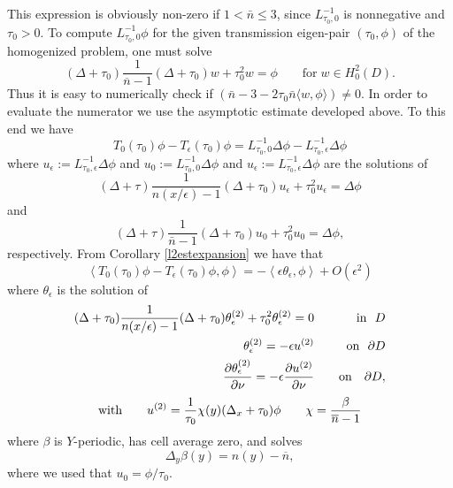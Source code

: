 \documentclass[12pt]{article}
\begin{document}
This expression is obviously non-zero if $1<\bar n\leq 3$, since $L^{-1}_{\tau_0,0}$ is nonnegative and $\tau_0>0$.  To compute  $L^{-1}_{\tau_0,0}\phi$ for the given transmission eigen-pair $(\tau_0,\phi)$ of the homogenized problem, one must solve 
$$(\Delta +\tau_0 ) \frac{1}{\overline{n}-1} (\Delta +\tau_0 )w +\tau_0^2w=\phi \qquad \mbox{for}\; w\in H^2_0(D).$$
Thus it is easy to numerically check if $\left(\bar n-3  -2\tau_0\bar n \langle w,\phi\rangle\right)\neq 0$. In order to  evaluate the numerator we use the asymptotic estimate developed above.  To this end we have 
$$T_0(\tau_0)\phi-T_\epsilon(\tau_0)\phi=L_{\tau_0,0}^{-1}\Delta \phi-L_{\tau_0,\epsilon}^{-1}\Delta \phi$$
where $u_\epsilon:=L_{\tau_0,\epsilon}^{-1}\Delta \phi$  and  $u_0:=L_{\tau_0,0}^{-1}\Delta \phi$ and $u_\epsilon:=L_{\tau_0,\epsilon}^{-1}\Delta \phi$ are the solutions of 
\begin{equation*}  (\Delta +\tau) \frac{1}{n(x/\epsilon)-1}(\Delta +\tau_0) u_\epsilon +\tau_0^2 u_\epsilon= \Delta \phi \end{equation*}
and
\begin{equation*}  (\Delta +\tau) \frac{1}{\bar n-1} (\Delta +\tau_0) u_0 +\tau_0^2 u_0= \Delta \phi,
\end{equation*}
respectively.  From Corollary \ref{l2estexpansion} we have that 
\begin{equation}\label{numform}\left<T_0(\tau_0)\phi-T_\epsilon(\tau_0)\phi, \phi\right>=-\left<\epsilon\theta_\epsilon,\phi\right>+O(\epsilon^2)\end{equation}
where $\theta_\epsilon$ is the solution of 
\begin{eqnarray}   (\Delta +\tau_0) \frac{1}{n(x/\epsilon)-1} (\Delta +\tau_0) \theta_\epsilon^{(2)} +\tau_0^2\theta_\epsilon^{(2)} =  0 && \ \ \ \mbox{in}\ \ D \label{finaltheta} \\ 
\theta_\epsilon^{(2)} = -\epsilon u^{(2)} && \ \ \mbox{on}\ \ \partial D \nonumber \\ {\partial  \theta_\epsilon^{(2)} \over{\partial\nu}}= -\epsilon {\partial u^{(2)}\over{\partial\nu}} &&\ \ \ \mbox{on} \ \ \ \partial D,\nonumber\end{eqnarray}
$$ \mbox{with} \qquad u^{(2)} = \frac{1}{\tau_0}\chi(y) (\Delta_x +\tau_0) \phi   \qquad  \chi ={\beta \over{\overline{n}-1}}$$
where $\beta$ is $Y$-periodic, has cell average zero, and solves  $$\Delta_y \beta(y) = {n(y) -\overline{n}},$$ where we used that  $u_0=\phi/\tau_0$. 
\end{document}
